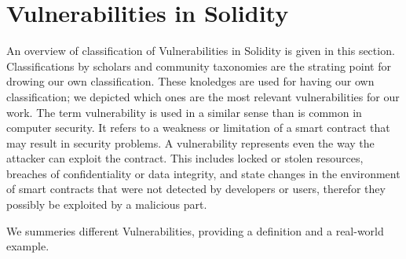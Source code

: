 \documentclass[a4paper,sigconf, language=french,
language=german, language=spanish, language=english]{acmart}
\begin{document}
\section{Vulnerabilities in Solidity}
\label{Vulnerabilities}
An overview of classification of Vulnerabilities in Solidity is given in this section. 
Classifications by scholars and community taxonomies are the strating point for drowing our own classification. 
These knoledges are used for having our own classification; we depicted which ones are the most relevant 
vulnerabilities for our work.
The term vulnerability is used in a similar sense than is common in computer security. 
It refers to a weakness or limitation of a smart contract that may result in
security problems. 
A vulnerability represents even the way the attacker can exploit the contract. 
This includes locked or stolen resources, breaches of confidentiality or data integrity, and state
changes in the environment of smart contracts that were not
detected by developers or users, therefor they possibly be exploited by a malicious part.

We summeries different Vulnerabilities, providing a definition and a real-world example.
\end{document}
